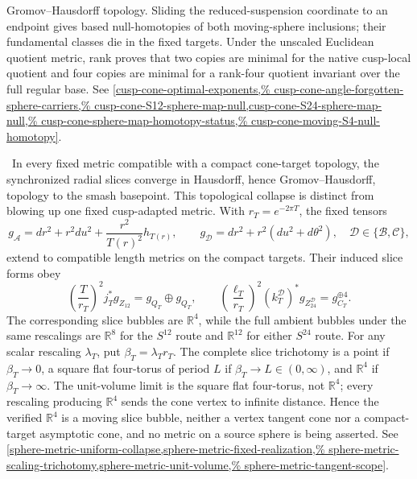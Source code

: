 \begin{auditrecord}
Gromov--Hausdorff topology.  Sliding the reduced-suspension coordinate to
an endpoint gives based null-homotopies of both moving-sphere inclusions;
their fundamental classes die in the fixed targets.  Under the unscaled
Euclidean quotient metric, rank proves that two copies are minimal for the
native cusp-local quotient and four copies are minimal for a rank-four
quotient invariant over the full regular base.  See
\cref{cusp-cone-optimal-exponents,%
cusp-cone-angle-forgotten-sphere-carriers,%
cusp-cone-S12-sphere-map-null,cusp-cone-S24-sphere-map-null,%
cusp-cone-sphere-map-homotopy-status,%
cusp-cone-moving-S4-null-homotopy}.
\end{auditrecord}

\begin{auditrecord}
\Verified\ In every fixed metric compatible with a compact cone-target
topology, the synchronized radial slices converge in Hausdorff, hence
Gromov--Hausdorff, topology to the smash basepoint.  This topological
collapse is distinct from blowing up one fixed cusp-adapted metric.  With
\(r_T=e^{-2\pi T}\), the fixed tensors
\[
 g_{\mathcal A}=dr^2+r^2du^2+\frac{r^2}{T(r)^2}h_{T(r)},
 \qquad
 g_{\mathcal D}=dr^2+r^2(du^2+d\theta^2),
 \quad \mathcal D\in\{\mathcal B,\mathcal C\},
\]
extend to compatible length metrics on the compact targets.  Their induced
slice forms obey
\[
 \left(\frac{T}{r_T}\right)^2j_T^*g_{Z_{12}}
 =g_{Q_T}\oplus g_{Q_T},
 \qquad
 \left(\frac{\ell_T}{r_T}\right)^2
 (k_T^{\mathcal D})^*g_{Z_{24}^{\mathcal D}}
 =g_{C_T}^{\oplus4}.
\]
The corresponding slice bubbles are \(\mathbb R^4\), while the full
ambient bubbles under the same rescalings are \(\mathbb R^8\) for the
\(S^{12}\) route and \(\mathbb R^{12}\) for either \(S^{24}\) route.
For any scalar rescaling \(\lambda_T\), put
\(\beta_T=\lambda_Tr_T\).  The complete slice trichotomy is a point if
\(\beta_T\to0\), a square flat four-torus of period \(L\) if
\(\beta_T\to L\in(0,\infty)\), and \(\mathbb R^4\) if
\(\beta_T\to\infty\).  The unit-volume limit is the square flat four-torus,
not \(\mathbb R^4\); every rescaling producing \(\mathbb R^4\) sends the
cone vertex to infinite distance.  Hence the verified \(\mathbb R^4\) is a
moving slice bubble, neither a vertex tangent cone nor a compact-target
asymptotic cone, and no metric on a source sphere is being asserted.  See
\cref{sphere-metric-uniform-collapse,sphere-metric-fixed-realization,%
sphere-metric-scaling-trichotomy,sphere-metric-unit-volume,%
sphere-metric-tangent-scope}.
\end{auditrecord}


